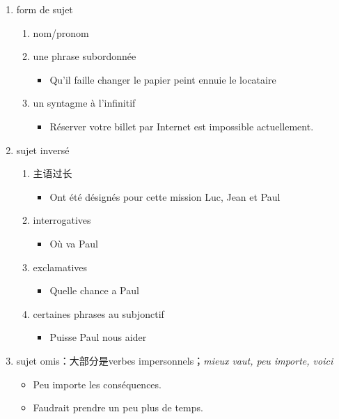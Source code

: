 \documentclass[UTF8]{report}
\begin{document}
\begin{enumerate}
    \item form de sujet
    \begin{enumerate}
        \item nom/pronom
        \item une phrase subordonnée
        \begin{itemize}
            \item Qu’il faille changer le papier peint ennuie le locataire
        \end{itemize}
        \item un syntagme à l’infinitif
        \begin{itemize}
            \item Réserver votre billet par Internet est impossible actuellement.
        \end{itemize}
    \end{enumerate}
    \item sujet inversé
    \begin{enumerate}
        \item 主语过长
        \begin{itemize}
            \item Ont été désignés pour cette mission Luc, Jean et Paul
        \end{itemize}
        \item interrogatives
        \begin{itemize}
            \item Où va Paul
        \end{itemize}
        \item exclamatives
        \begin{itemize}
            \item Quelle chance a Paul
        \end{itemize}
        \item certaines phrases au subjonctif
        \begin{itemize}
            \item Puisse Paul nous aider
        \end{itemize}
    \end{enumerate}
    \item sujet omis：大部分是verbes impersonnels；\textit{mieux vaut, peu importe, voici}
    \begin{itemize}
        \item Peu importe les conséquences.
        \item Faudrait prendre un peu plus de temps.

\end{itemize}
\end{enumerate}
\end{document}
